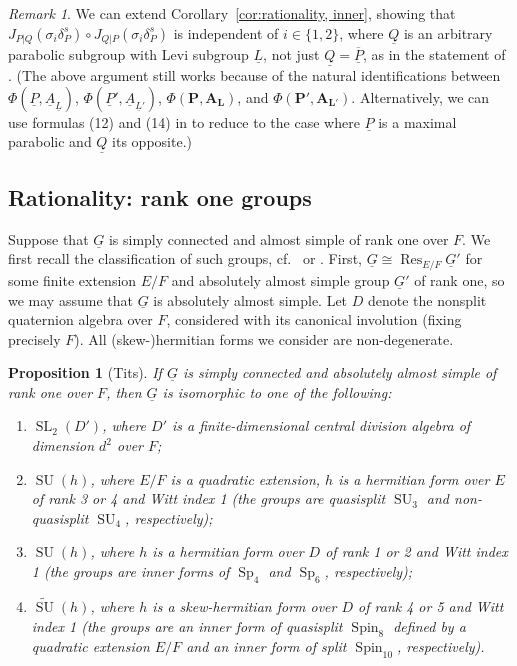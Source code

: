 \documentclass[a4paper]{amsart}
\numberwithin{equation}{section}
\newtheorem{prop}[thm]{Proposition}
\theoremstyle{remark}
\newtheorem{remark}[thm]{Remark}
\theoremstyle{definition}
\DeclareMathOperator{\Res}{Res}
\DeclareMathOperator{\SL}{SL}
\DeclareMathOperator{\SU}{SU}
\newcommand{\tSU}{\widetilde{\SU}}
\DeclareMathOperator{\Sp}{Sp}
\DeclareMathOperator{\Spin}{Spin}
\newcommand{\alggrp}[1]{\underline{#1}}
\newcommand{\glob}[1]{\boldsymbol{#1}}
\begin{document}
\begin{remark}\label{rk:choiy}
  We can extend Corollary~\ref{cor:rationality, inner}, showing that $J_{P|Q}(\sigma_{i}\delta_{P}^{s})\circ J_{Q|P}(\sigma_{i}\delta_{P}^{s})$ is independent of $i \in \{1,2\}$, where $\alggrp Q$ is an arbitrary parabolic subgroup with Levi subgroup $\alggrp L$, not just $\alggrp Q = \overline{\alggrp P}$, as in the statement of \cite[Working Hypothesis 1.1]{MR3194161}.
  (The above argument still works because of the natural identifications between $\Phi(\alggrp{P},\alggrp{A}_{\alggrp{L}})$, $\Phi(\alggrp{P}',\alggrp{A}_{\alggrp{L}'})$, $\Phi(\glob{P},\glob{A}_{\glob{L}})$, and $\Phi(\glob{P}',\glob{A}_{\glob{L}'})$. Alternatively, we can use formulas (12) and (14) in \cite[IV.1]{MR1989693} to reduce to the case where $\alggrp P$ is a maximal parabolic and $\alggrp Q$ its opposite.)
\end{remark}

\subsection{Rationality: rank one groups}
\label{sec:rank-one-groups}

Suppose that $\alggrp{G}$ is simply connected and almost simple of rank one over $F$. 
We first recall the classification of such groups, cf.\ \cite[Table II]{MR0224710} or \cite[\S4]{BT2}. 
First, $\alggrp{G} \cong \Res_{E/F} \alggrp{G}'$ for some finite extension $E/F$ and absolutely almost simple group $\alggrp{G}'$ of rank one, 
so we may assume that $\alggrp{G}$ is absolutely almost simple.
Let $D$ denote the nonsplit quaternion algebra over $F$, considered with its canonical involution (fixing precisely $F$).
All (skew-)hermitian forms we consider are non-degenerate.

\begin{prop}[Tits]\label{prop:rank-one-groups}
  If $\alggrp{G}$ is simply connected and absolutely almost simple of rank one over $F$, then $\alggrp{G}$ is isomorphic to one of the following:
  \begin{enumerate}
  \item $\SL_2(D')$, where $D'$ is a finite-dimensional central division algebra of dimension $d^2$ over $F$;
  \item $\SU(h)$, where $E/F$ is a quadratic extension, $h$ is a hermitian form over $E$ of rank 3 or 4 and Witt index 1
    (the groups are quasisplit $\SU_3$ and non-quasisplit $\SU_4$, respectively);
  \item $\SU(h)$, where $h$ is a hermitian form over $D$ of rank 1 or 2 and Witt index 1
    (the groups are inner forms of $\Sp_4$ and $\Sp_6$, respectively);
  \item $\tSU(h)$, where $h$ is a skew-hermitian form over $D$ of rank 4 or 5 and Witt index 1
    (the groups are an inner form of quasisplit $\Spin_8$ defined by a quadratic extension $E/F$ and an inner form of split $\Spin_{10}$, respectively).
  \end{enumerate}
\end{prop}
\end{document}
